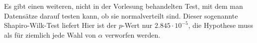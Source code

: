 \begin{loesung}
Es gibt einen weiteren, nicht in der Vorlesung behandelten Test, mit dem
man Datensätze darauf testen kann, ob sie normalverteilt sind. Dieser
sogenannte Shapiro-Wilk-Test liefert 
Hier ist der $p$-Wert nur $2.845\cdot 10^{-5}$, die Hypothese muss
als für ziemlich jede Wahl von $\alpha$ verworfen werden.
\end{loesung}

